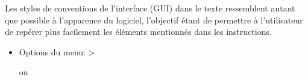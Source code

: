 
Les styles de conventions de l'interface (GUI) dans le texte ressemblent autant que possible à l'apparence du logiciel, l'objectif étant de permettre à l'utilisateur de repérer plus facilement les éléments mentionnés dans les instructions.

\begin{itemize}
%
\item Options du menu:  > %
%
% 
% 

ou


\end{itemize}
